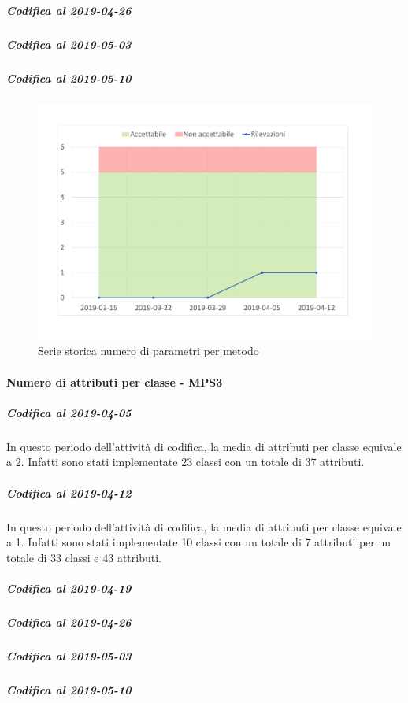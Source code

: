 \subparagraph{Codifica al 2019-04-26}

\subparagraph{Codifica al 2019-05-03}

\subparagraph{Codifica al 2019-05-10}

\begin{figure}[H]
	\centering
	\includegraphics[scale=0.6]{images/resoconto/MPS2Chart.pdf}
	\caption{Serie storica numero di parametri per metodo}	
\end{figure}

\paragraph{Numero di attributi per classe - MPS3}
\subparagraph{Codifica al 2019-04-05}
In questo periodo dell'attività di codifica, la media di attributi per classe equivale a 2. Infatti sono stati implementate 23 classi con un totale di 37 attributi.

\subparagraph{Codifica al 2019-04-12}
In questo periodo dell'attività di codifica, la media di attributi per classe equivale a 1. Infatti sono stati implementate 10 classi con un totale di 7 attributi per un totale di 33 classi e 43 attributi.

\subparagraph{Codifica al 2019-04-19}

\subparagraph{Codifica al 2019-04-26}

\subparagraph{Codifica al 2019-05-03}

\subparagraph{Codifica al 2019-05-10}

